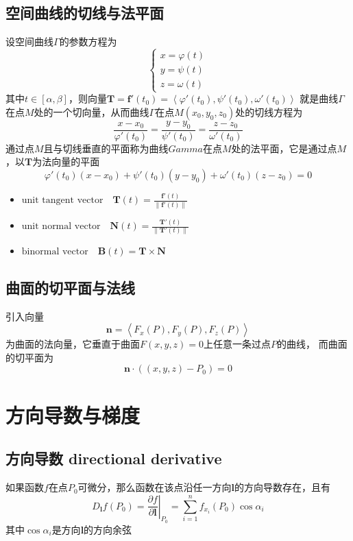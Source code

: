 \documentclass[UTF8]{ctexart}
\newcommand{\ve}[1]{{\bm{#1}}}
\newcommand{\veN}[3]{{\left\langle#1,#2,#3\right\rangle}}
\newcommand{\when}[2]{{\left.{#1}\right|_{#2}}}
\begin{document}
\subsection*{空间曲线的切线与法平面}
设空间曲线$\Gamma$的参数方程为
\[
\begin{cases}
  x=\varphi(t)\\
  y=\psi(t)\\
  z=\omega(t)
\end{cases}
\]
其中$t\in[\alpha,\beta]$，则向量$\ve{T}=\ve{f'}(t_0)=\left\langle \varphi'(t_0),\psi'(t_0),\omega'(t_0) \right\rangle$
就是曲线$\Gamma$在点$M$处的一个切向量，从而曲线$\Gamma$在点$M(x_0,y_0,z_0)$处的切线方程为
\[\frac{x-x_0}{\varphi'(t_0)}=\frac{y-y_0}{\psi'(t_0)}=\frac{z-z_0}{\omega'(t_0)}\]
通过点$M$且与切线垂直的平面称为曲线$Gamma$在点$M$处的法平面，它是通过点$M$，以$\ve{T}$为法向量的平面
\[\varphi'(t_0)(x-x_0)+\psi'(t_0)(y-y_0)+\omega'(t_0)(z-z_0)=0\]

\begin{itemize}
  \item $\displaystyle\text{unit tangent vector}\quad\ve{T}(t) = \frac{\ve{f'}(t)}{\|\ve{f'}(t)\|}$
  \item $\displaystyle\text{unit normal vector}\quad\ve{N}(t)=\frac{\ve{T'}(t)}{\|\ve{T'}(t)\|}$
  \item $\displaystyle\text{binormal vector}\quad\ve{B}(t)=\ve{T}\times\ve{N}$
\end{itemize}

\subsection*{曲面的切平面与法线}
引入向量
\[\ve{n}=\veN{F_x(P)}{F_y(P)}{F_z(P)}\]
为曲面的法向量，它垂直于曲面$F(x,y,z)=0$上任意一条过点$P$的曲线，
而曲面的切平面为
\[\ve{n}\cdot((x,y,z)-P_0)=0\]
\bigskip
\bigskip

\section*{方向导数与梯度}

\bigskip
\subsection*{方向导数 directional derivative}
如果函数$f$在点$P_0$可微分，那么函数在该点沿任一方向$\ve{l}$的方向导数存在，且有
\[D_\ve{l}f(P_0)=\when{\frac{\partial f}{\partial \ve{l}}}{P_0}=\sum^n_{i=1}f_{x_i}(P_0)\cos\alpha_i\]
其中$\cos\alpha_i$是方向$\ve{l}$的方向余弦
\end{document}
